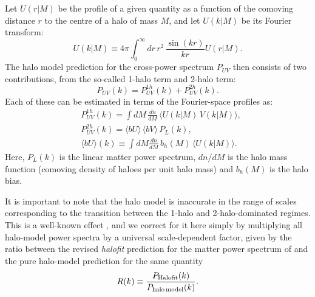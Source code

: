 \documentclass[useAMS,usenatbib]{mn2e}
\begin{document}
    Let $U(r|M)$ be the profile of a given quantity as a function of the comoving distance $r$ to the centre of a halo of mass $M$, and let $U(k|M)$ be its Fourier transform:
    \begin{equation}
      U(k|M)\equiv4\pi \int_0^\infty dr\,r^2\,\frac{\sin(kr)}{kr}U(r|M).
    \end{equation}
    The halo model prediction for the cross-power spectrum $P_{UV}$ then consists of two contributions, from the so-called 1-halo term and 2-halo term:
    \begin{equation}
      P_{UV}(k)=P^{1h}_{UV}(k)+P^{2h}_{UV}(k).
    \end{equation}
    Each of these can be estimated in terms of the Fourier-space profiles as:
    \begin{align}
      &P^{1h}_{UV}(k)=\int dM\,\frac{dn}{dM}\,\langle U(k|M)\,V(k|M)\rangle,\\
      &P^{2h}_{UV}(k)=\langle bU\rangle\,\langle bV\rangle\,P_L(k),\\
      &\langle bU\rangle(k)\equiv\int dM\frac{dn}{dM}\,b_h(M)\,\langle U(k|M)\rangle. \label{eq:hm_bias}
    \end{align}
    Here, $P_L(k)$ is the linear matter power spectrum, $dn/dM$ is the halo mass function (comoving density of haloes per unit halo mass) and $b_h(M)$ is the halo bias.

    It is important to note that the halo model is inaccurate in the range of scales corresponding to the transition between the 1-halo and 2-halo-dominated regimes. This is a well-known effect \citep{2015MNRAS.454.1958M}, and we correct for it here simply by multiplying all halo-model power spectra by a universal scale-dependent factor, given by the ratio between the revised {\sl halofit} prediction for the matter power spectrum of \cite{2012ApJ...761..152T} and the pure halo-model prediction for the same quantity
    \begin{equation}
      R(k)\equiv\frac{P_{\rm Halofit}(k)}{P_{\rm halo\,model}(k)}.
    \end{equation}
    
\end{document}
